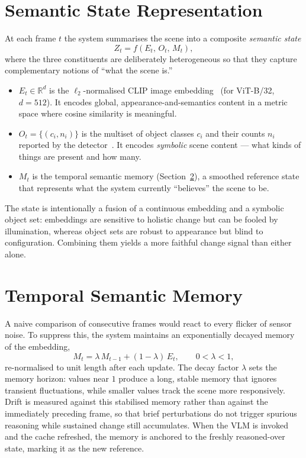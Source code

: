 \section{Semantic State Representation}
\label{sec:meth-state}

At each frame $t$ the system summarises the scene into a composite
\emph{semantic state}
\begin{equation}
  Z_t = f\!\left(E_t,\, O_t,\, M_t\right),
  \label{eq:state}
\end{equation}
where the three constituents are deliberately heterogeneous so that they
capture complementary notions of ``what the scene is.''

\begin{itemize}
  \item $E_t \in \mathbb{R}^{d}$ is the $\ell_2$-normalised CLIP image
  embedding~\cite{Radford2021CLIP} (for ViT-B/32, $d = 512$). It encodes
  global, appearance-and-semantics content in a metric space where cosine
  similarity is meaningful.
  \item $O_t = \{(c_i, n_i)\}$ is the multiset of object classes $c_i$ and
  their counts $n_i$ reported by the detector~\cite{Jocher2023YOLOv8}. It
  encodes \emph{symbolic} scene content --- what kinds of things are present
  and how many.
  \item $M_t$ is the temporal semantic memory (Section~\ref{sec:meth-memory}),
  a smoothed reference state that represents what the system currently
  ``believes'' the scene to be.
\end{itemize}

The state is intentionally a fusion of a continuous embedding and a symbolic
object set: embeddings are sensitive to holistic change but can be fooled by
illumination, whereas object sets are robust to appearance but blind to
configuration. Combining them yields a more faithful change signal than
either alone.

\section{Temporal Semantic Memory}
\label{sec:meth-memory}

A naive comparison of consecutive frames would react to every flicker of
sensor noise. To suppress this, the system maintains an exponentially decayed
memory of the embedding,
\begin{equation}
  M_t = \lambda\, M_{t-1} + (1-\lambda)\, E_t,
  \qquad 0 < \lambda < 1,
  \label{eq:memory}
\end{equation}
re-normalised to unit length after each update. The decay factor $\lambda$
sets the memory horizon: values near $1$ produce a long, stable memory that
ignores transient fluctuations, while smaller values track the scene more
responsively. Drift is measured against this stabilised memory rather than
against the immediately preceding frame, so that brief perturbations do not
trigger spurious reasoning while sustained change still accumulates. When the
VLM is invoked and the cache refreshed, the memory is anchored to the
freshly reasoned-over state, marking it as the new reference.

